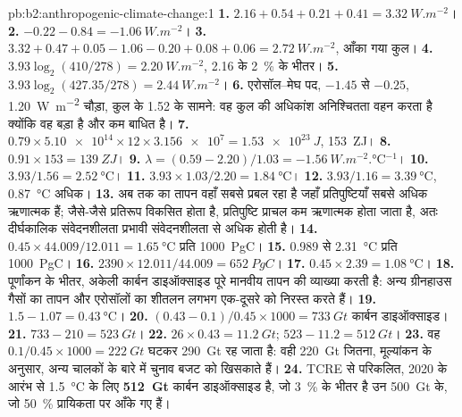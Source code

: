 \begin{solution}{pb:b2:anthropogenic-climate-change:1}
\textbf{1.} $2.16 + 0.54 + 0.21 + 0.41 = \qty{3.32}{W.m^{-2}}$।
\textbf{2.} $-0.22 - 0.84 = \qty{-1.06}{W.m^{-2}}$।
\textbf{3.} $3.32 + 0.47 + 0.05 - 1.06 - 0.20 + 0.08 + 0.06 = \qty{2.72}{W.m^{-2}}$, आँका गया
कुल।
\textbf{4.} $3.93\log_2(410/278) = \qty{2.20}{W.m^{-2}}$, 2.16 के \qty{2}{\percent} के भीतर।
\textbf{5.} $3.93\log_2(427.35/278) = \qty{2.44}{W.m^{-2}}$।
\textbf{6.} एरोसॉल--मेघ पद, $-1.45$ से $-0.25$, \qty{1.20}{W.m^{-2}} चौड़ा, कुल के 1.52 के
सामने: वह कुल की अधिकांश अनिश्चितता वहन करता है क्योंकि वह बड़ा है और कम
बाधित है।
\textbf{7.} $0.79 \times \num{5.10e14} \times 12 \times \num{3.156e7} = \qty{1.53e23}{J}$,
\qty{153}{ZJ}।
\textbf{8.} $0.91 \times 153 = \qty{139}{ZJ}$।
\textbf{9.} $\lambda = (0.59 - 2.20)/1.03 = \qty{-1.56}{W.m^{-2}.\celsius^{-1}}$।
\textbf{10.} $3.93/1.56 = \qty{2.52}{\celsius}$।
\textbf{11.} $3.93 \times 1.03/2.20 = \qty{1.84}{\celsius}$।
\textbf{12.} $3.93/1.16 = \qty{3.39}{\celsius}$, \qty{0.87}{\celsius} अधिक।
\textbf{13.} अब तक का तापन वहाँ सबसे प्रबल रहा है जहाँ प्रतिपुष्टियाँ सबसे अधिक ऋणात्मक हैं; जैसे-जैसे
प्रतिरूप विकसित होता है, प्रतिपुष्टि प्राचल कम ऋणात्मक होता जाता है, अतः दीर्घकालिक संवेदनशीलता
प्रभावी संवेदनशीलता से अधिक होती है।
\textbf{14.} $0.45 \times 44.009/12.011 = \qty{1.65}{\celsius}$ प्रति \qty{1000}{PgC}।
\textbf{15.} 0.989 से \qty{2.31}{\celsius} प्रति \qty{1000}{PgC}।
\textbf{16.} $2390 \times 12.011/44.009 = \qty{652}{PgC}$।
\textbf{17.} $0.45 \times 2.39 = \qty{1.08}{\celsius}$।
\textbf{18.} पूर्णांकन के भीतर, अकेली कार्बन डाइऑक्साइड पूरे मानवीय तापन की व्याख्या करती है: अन्य
ग्रीनहाउस गैसों का तापन और एरोसॉलों का शीतलन लगभग एक-दूसरे को निरस्त करते हैं।
\textbf{19.} $1.5 - 1.07 = \qty{0.43}{\celsius}$।
\textbf{20.} $(0.43 - 0.1)/0.45 \times 1000 = \qty{733}{Gt}$ कार्बन डाइऑक्साइड।
\textbf{21.} $733 - 210 = \qty{523}{Gt}$।
\textbf{22.} $26 \times 0.43 = \qty{11.2}{Gt}$; $523 - 11.2 = \qty{512}{Gt}$।
\textbf{23.} वह $0.1/0.45 \times 1000 = \qty{222}{Gt}$ घटकर \qty{290}{Gt} रह जाता है: वही
\qty{220}{Gt} जितना, मूल्यांकन के अनुसार, अन्य चालकों के बारे में चुनाव बजट को खिसकाते हैं।
\textbf{24.} TCRE से परिकलित, 2020 के आरंभ से \qty{1.5}{\celsius} के लिए 
\textbf{\qty[text-series-to-math=true]{512}{Gt}} कार्बन डाइऑक्साइड है, जो \qty{3}{\percent} के भीतर है उन
\qty{500}{Gt} के, जो \qty{50}{\percent} प्रायिकता पर आँके गए हैं।
\end{solution}
